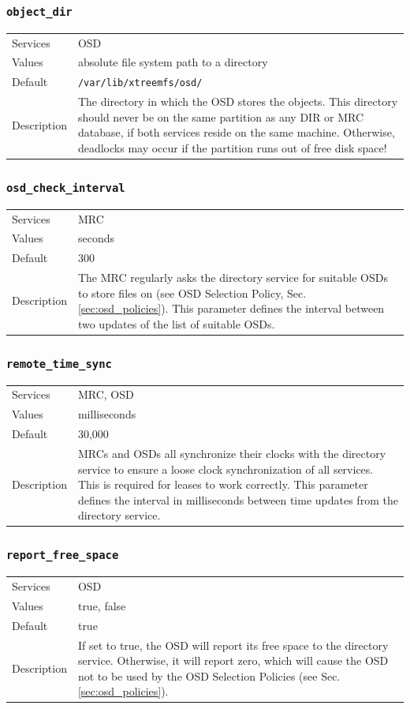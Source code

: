\documentclass[a4paper,10pt]{book}
\begin{document}
\subsubsection{\texttt{object\_dir}}
\begin{tabular}{lp{10cm}}
 Services & OSD\\
 Values   & absolute file system path to a directory\\
 Default  & \texttt{/var/lib/xtreemfs/osd/}\\
 Description & The directory in which the OSD stores the objects. This directory should never be on the same partition as any DIR or MRC database, if both services reside on the same machine. Otherwise, deadlocks may occur if the partition runs out of free disk space!
\end{tabular}

\subsubsection{\texttt{osd\_check\_interval}}
\begin{tabular}{lp{10cm}}
 Services & MRC\\
 Values   & seconds \\
 Default  & 300\\
 Description & The MRC regularly asks the directory service for suitable OSDs to store files on (see OSD Selection Policy, Sec. \ref{sec:osd_policies}). This parameter defines the interval between two updates of the list of suitable OSDs.
\end{tabular}

\subsubsection{\texttt{remote\_time\_sync}}
\begin{tabular}{lp{10cm}}
 Services & MRC, OSD\\
 Values   & milliseconds \\
 Default  & 30,000\\
 Description & MRCs and OSDs all synchronize their clocks with the directory service to ensure a loose clock synchronization of all services. This is required for leases to work correctly. This parameter defines the interval in milliseconds between time updates from the directory service.
\end{tabular}

\subsubsection{\texttt{report\_free\_space}}
\begin{tabular}{lp{10cm}}
 Services & OSD\\
 Values   & true, false\\
 Default  & true\\
 Description & If set to true, the OSD will report its free space to the directory service. Otherwise, it will report zero, which will cause the OSD not to be used by the OSD Selection Policies (see Sec. \ref{sec:osd_policies}).
\end{tabular}
\end{document}
